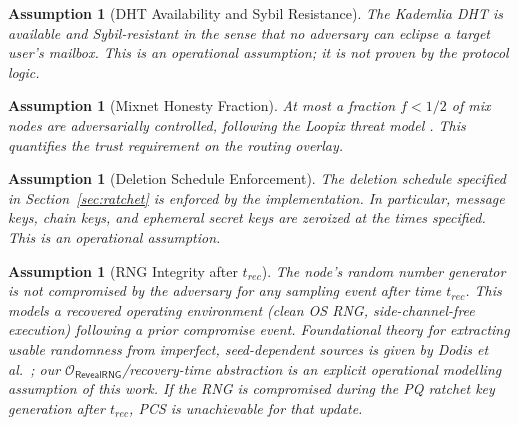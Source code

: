 \documentclass[11pt,a4paper]{article}
\theoremstyle{remark}
\theoremstyle{plain}
\newtheorem{assumption}[theorem]{Assumption}
\begin{document}
\begin{assumption}[DHT Availability and Sybil Resistance]
\label{asm:dht}
The Kademlia DHT is available and Sybil-resistant in the sense that no adversary can eclipse
a target user's mailbox.  This is an operational assumption; it is not proven by the protocol
logic.
\end{assumption}

\begin{assumption}[Mixnet Honesty Fraction]
\label{asm:mixnet}
At most a fraction $f < 1/2$ of mix nodes are adversarially controlled, following the Loopix
threat model \cite{loopix}.  This quantifies the trust requirement on the routing overlay.
\end{assumption}

\begin{assumption}[Deletion Schedule Enforcement]
\label{asm:deletion}
The deletion schedule specified in Section~\ref{sec:ratchet} is enforced by the implementation.
In particular, message keys, chain keys, and ephemeral secret keys are zeroized at the times
specified.  This is an operational assumption.
\end{assumption}

\begin{assumption}[RNG Integrity after $t_{rec}$]
\label{asm:rng}
The node's random number generator is not compromised by the adversary for any sampling event
after time $t_{rec}$.  This models a recovered operating environment (clean OS RNG,
side-channel-free execution) following a prior compromise event.  Foundational theory for
extracting usable randomness from imperfect, seed-dependent sources is given by
Dodis et al.\ \cite{dodis2013entropic}; our $\mathcal{O}_{\mathsf{RevealRNG}}$/recovery-time
abstraction is an explicit operational modelling assumption of this work.  If the RNG is
compromised during the PQ ratchet
key generation after $t_{rec}$, PCS is unachievable for that update.
\end{assumption}
\end{document}
